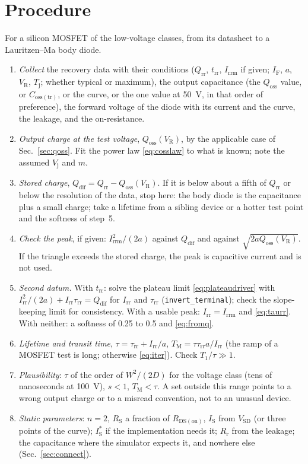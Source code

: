 \documentclass[10pt,a4paper]{scrartcl}
\newcommand{\IF}{I_\mathrm{F}}
\newcommand{\VR}{V_\mathrm{R}}
\newcommand{\Irr}{I_\mathrm{rr}}
\newcommand{\Irrm}{I_\mathrm{rrm}}
\newcommand{\Qrr}{Q_\mathrm{rr}}
\newcommand{\Qdif}{Q_\mathrm{dif}}
\newcommand{\Qoss}{Q_\mathrm{oss}}
\newcommand{\trr}{t_\mathrm{rr}}
\newcommand{\taurr}{\tau_\mathrm{rr}}
\newcommand{\TM}{T_\mathrm{M}}
\newcommand{\Tone}{T_1}
\newcommand{\IS}{I_\mathrm{S}}
\newcommand{\RS}{R_\mathrm{S}}
\newcommand{\Rr}{R_\mathrm{r}}
\newcommand{\Rds}{R_\mathrm{DS(on)}}
\newcommand{\VSD}{V_\mathrm{SD}}
\newcommand{\Vj}{V_\mathrm{j}}
\newcommand{\Tj}{T_\mathrm{j}}
\begin{document}
\section{Procedure}
\label{sec:procedure}
For a silicon MOSFET of the low-voltage classes, from its datasheet to a Lauritzen--Ma body diode.
\begin{enumerate}
\item \emph{Collect} the recovery data with their conditions ($\Qrr$, $\trr$, $\Irrm$ if given; $\IF$, $a$, $\VR$, $\Tj$; whether typical or maximum), the output capacitance (the $\Qoss$ value, or $C_\mathrm{oss(tr)}$, or the curve, or the one value at \SI{50}{\volt}, in that order of preference), the forward voltage of the diode with its current and the curve, the leakage, and the on-resistance.
\item \emph{Output charge at the test voltage}, $\Qoss(\VR)$, by the applicable case of Sec.~\ref{sec:qoss}. Fit the power law \eqref{eq:cosslaw} to what is known; note the assumed $\Vj$ and $m$.
\item \emph{Stored charge}, $\Qdif = \Qrr - \Qoss(\VR)$. If it is below about a fifth of $\Qrr$ or below the resolution of the data, stop here: the body diode is the capacitance plus a small charge; take a lifetime from a sibling device or a hotter test point and the softness of step~5.
\item \emph{Check the peak}, if given: $\Irrm^2/(2a)$ against $\Qdif$ and against $\sqrt{2a\Qoss(\VR)}$. If the triangle exceeds the stored charge, the peak is capacitive current and is not used.
\item \emph{Second datum.} With $\trr$: solve the plateau limit \eqref{eq:plateaudriver} with $\Irr^2/(2a) + \Irr\taurr = \Qdif$ for $\Irr$ and $\taurr$ (\texttt{invert\_terminal}); check the slope-keeping limit for consistency. With a usable peak: $\Irr = \Irrm$ and \eqref{eq:taurr}. With neither: a softness of 0.25 to 0.5 and \eqref{eq:fromq}.
\item \emph{Lifetime and transit time}, $\tau = \taurr + \Irr/a$, $\TM = \tau\taurr a/\Irr$ (the ramp of a MOSFET test is long; otherwise \eqref{eq:iter}). Check $\Tone/\tau \gg 1$.
\item \emph{Plausibility}: $\tau$ of the order of $W^2/(2D)$ for the voltage class (tens of nanoseconds at \SI{100}{\volt}), $s < 1$, $\TM < \tau$. A set outside this range points to a wrong output charge or to a misread convention, not to an unusual device.
\item \emph{Static parameters}: $n = 2$, $\RS$ a fraction of $\Rds$, $\IS$ from $\VSD$ (or three points of the curve); $\IS^{*}$ if the implementation needs it; $\Rr$ from the leakage; the capacitance where the simulator expects it, and nowhere else (Sec.~\ref{sec:connect}).

\end{enumerate}
\end{document}
